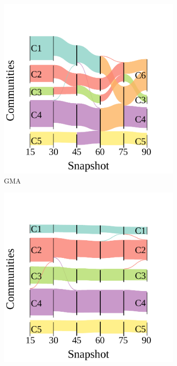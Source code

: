 \documentclass[letterpaper]{article}
\begin{document}
\begin{figure}[!t]
    \centering
    \begin{subfigure}[b]{.24\linewidth}
        \centering
        \includegraphics[width=\linewidth]{figures/sankey_intermittence_GMA.pdf}
        \caption{GMA}
        \label{fig:sankey_noise_GMA}
    \end{subfigure}
    \begin{subfigure}[b]{.24\linewidth}
        \centering
        \includegraphics[width=\linewidth]{figures/sankey_intermittence_aGMA.pdf}

\end{subfigure}
\end{figure}
\end{document}
